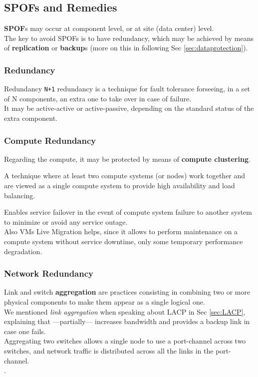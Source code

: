 \subsection{SPOFs and Remedies}
\textbf{SPOF}s may occur at component level, or at site (data center) level.\\
The key to avoid SPOFs is to have redundancy, which may be achieved by means of \textbf{replication} or \textbf{backup}s (more on this in following Sec \ref{sec:dataprotection}).

\subsubsection*{Redundancy}
Redundancy \texttt{N+1} redundancy is a technique for fault tolerance forseeing, in a set of N components, an extra one to take over in case of failure.\\
It may be active-active or active-passive, depending on the standard status of the extra component.

\subsubsection{Compute Redundancy}
Regarding the compute, it may be protected by means of \textbf{compute clustering}.
\begin{definition}
   A technique where at least two compute systems (or nodes) work together and are viewed as a single compute system to provide high availability and load balancing. 
\end{definition}
Enables service failover in the event of compute system failure to another system to minimize or avoid any service outage.\\
Also VMs Live Migration helps, since it allows to perform maintenance on a compute system without service downtime, only some temporary performance degradation.

\subsubsection{Network Redundancy}
Link and switch \textbf{aggregation} are practices consisting in combining two or more physical components to make them appear as a single logical one.\\
We mentioned \textit{link aggregation} when speaking about LACP in Sec \ref{sec:LACP}, explaining that ---partially--- increases bandwidth and provides a backup link in case one fails.\\
Aggregating two switches allows a single node to use a port-channel across two switches, and network traffic is distributed across all the links in the port-channel.\\
.

